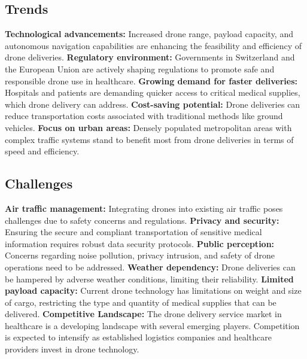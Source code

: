 \subsection{Trends}
\textbf{Technological advancements:} Increased drone range, payload capacity, and autonomous navigation capabilities are enhancing the feasibility and efficiency of drone deliveries. \cite{fortunebusinessinsights_2023_medical}
\newline
\textbf{Regulatory environment:} Governments in Switzerland and the European Union are actively shaping regulations to promote safe and responsible drone use in healthcare. \cite{fortunebusinessinsights_2023_medical}
\newline
\textbf{Growing demand for faster deliveries:} Hospitals and patients are demanding quicker access to critical medical supplies, which drone delivery can address. \cite{fortunebusinessinsights_2023_medical}
\newline
\textbf{Cost-saving potential:} Drone deliveries can reduce transportation costs associated with traditional methods like ground vehicles. \cite{fortunebusinessinsights_2023_medical}
\newline
\textbf{Focus on urban areas:} Densely populated metropolitan areas with complex traffic systems stand to benefit most from drone deliveries in terms of speed and efficiency. \cite{fortunebusinessinsights_2023_medical}
\subsection{Challenges}
\textbf{Air traffic management:} Integrating drones into existing air traffic poses challenges due to safety concerns and regulations. \cite{fortunebusinessinsights_2023_medical}
\newline
\textbf{Privacy and security:} Ensuring the secure and compliant transportation of sensitive medical information requires robust data security protocols. \cite{fortunebusinessinsights_2023_medical}
\newline
\textbf{Public perception:} Concerns regarding noise pollution, privacy intrusion, and safety of drone operations need to be addressed. \cite{fortunebusinessinsights_2023_medical}
\newline
\textbf{Weather dependency:} Drone deliveries can be hampered by adverse weather conditions, limiting their reliability. \cite{fortunebusinessinsights_2023_medical}
\newline
\textbf{Limited payload capacity:} Current drone technology has limitations on weight and size of cargo, restricting the type and quantity of medical supplies that can be delivered. \cite{fortunebusinessinsights_2023_medical}
\newline
\textbf{Competitive Landscape:} The drone delivery service market in healthcare is a developing landscape with several emerging players. Competition is expected to intensify as established logistics companies and healthcare providers invest in drone technology. \cite{fortunebusinessinsights_2023_medical}
\newline
